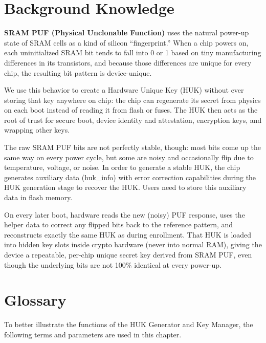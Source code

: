\documentclass[main\_\_EN.tex]{subfiles}
\begin{document}
\section{Background Knowledge}

\textbf{SRAM PUF (Physical Unclonable Function)} uses the natural power-up state of SRAM cells as a kind of silicon “fingerprint.” When a chip powers on, each uninitialized SRAM bit tends to fall into 0 or 1 based on tiny manufacturing differences in its transistors, and because those differences are unique for every chip, the resulting bit pattern is device-unique.

We use this behavior to create a Hardware Unique Key (HUK) without ever storing that key anywhere on chip: the chip can regenerate its secret from physics on each boot instead of reading it from flash or fuses. The HUK then acts as the root of trust for secure boot, device identity and attestation, encryption keys, and wrapping other keys.

The raw SRAM PUF bits are not perfectly stable, though: most bits come up the same way on every power cycle, but some are noisy and occasionally flip due to temperature, voltage, or noise. In order to generate a stable HUK, the chip generates auxiliary data (huk\_info) with error correction capabilities during the HUK generation stage to recover the HUK. Users need to store this auxiliary data in flash memory.

On every later boot, hardware reads the new (noisy) PUF response, uses the helper data to correct any flipped bits back to the reference pattern, and reconstructs exactly the same HUK as during enrollment. That HUK is loaded into hidden key slots inside crypto hardware (never into normal RAM), giving the device a repeatable, per-chip unique secret key derived from SRAM PUF, even though the underlying bits are not 100\% identical at every power-up.


\section{Glossary}

To better illustrate the functions of the HUK Generator and Key Manager, the following terms and parameters are used in this chapter.
\end{document}
